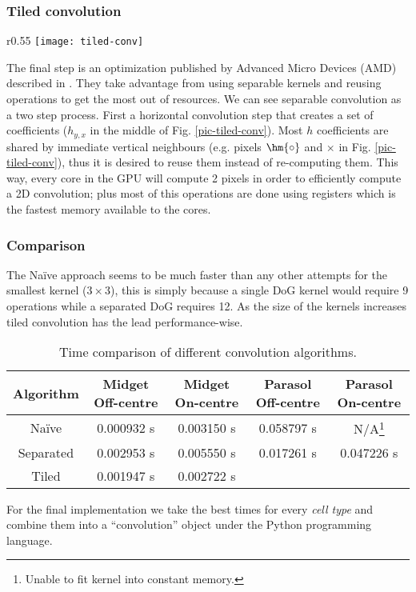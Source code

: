 \subsubsection{Tiled convolution}

\begin{wrapfigure}{r}{0.55\textwidth}
    \centering
    \texttt{[image: tiled-conv]}
    \caption{Tiled convolution flow}
    \label{pic-tiled-conv}
\end{wrapfigure}


The final step is an optimization published by Advanced Micro Devices (AMD) 
described in \cite{tiled-convolution}. They take advantage from using
separable kernels and reusing operations to get the most out of resources.
We can see separable convolution as a two step process. 
First a horizontal convolution step that creates a set of coefficients 
($h_{y,x}$ in the middle of Fig. \ref{pic-tiled-conv}). Most $h$ coefficients 
are shared by immediate vertical neighbours (e.g. pixels $\hm{\circ}$ 
and $\bm{\times}$ in Fig. \ref{pic-tiled-conv}), thus it is desired 
to reuse them instead of re-computing them. This way, every core in the GPU 
will compute 2 pixels in order to efficiently compute a 2D convolution; plus 
most of this operations are done using registers which is the fastest memory 
available to the cores.


\subsubsection{Comparison}
The Naïve approach seems to be much faster than any other attempts for the 
smallest kernel ($3\times3$), this is simply because a single DoG kernel would
require 9 operations while a separated DoG requires 12. As the size of the
kernels increases tiled convolution has the lead performance-wise.
\begin{table}[hbt]
    \begin{center}
        \caption{Time comparison of different convolution algorithms.}
        \bgroup
        \def\arraystretch{1.2}
        \begin{tabular}{|c|c|c|c|c|}
            \hline Algorithm & Midget Off-centre & Midget On-centre & Parasol Off-centre & Parasol On-centre \\
            \hline Naïve     & 0.000932 s & 0.003150 s & 0.058797 s & N/A\footnote{Unable to fit kernel into constant memory.} \\ 
            \hline Separated & 0.002953 s & 0.005550 s & 0.017261 s & 0.047226 s \\ 
            \hline Tiled     & 0.001947 s & 0.002722 s &  & \\ 
            \hline 
        \end{tabular} 
        \egroup
    \end{center}
\end{table}
\vspace*{-20pt}

For the final implementation we take the best times for every \emph{cell type}
and combine them into a ``convolution'' object under the Python programming language.